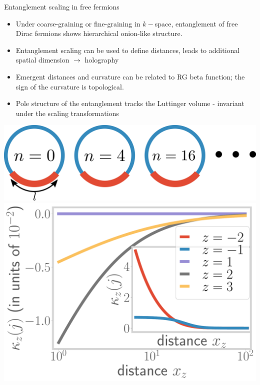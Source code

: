 \documentclass[10pt,aspectratio=169]{beamer}
\begin{document}
\begin{frame}{Entanglement scaling in free fermions}
\hspace*{-40pt}
\begin{minipage}{0.65\textwidth}
\begin{itemize}
	\item Under coarse-graining or fine-graining in \(k-\)space, entanglement of free Dirac fermions shows hierarchical onion-like structure.
	\item Entanglement scaling can be used to define distances, leads to additional spatial dimension \(\longrightarrow\) holography
	\item Emergent distances and curvature can be related to RG beta function; the sign of the curvature is topological.
	\item Pole structure of the entanglement tracks the Luttinger volume - invariant under the scaling transformations
\end{itemize}
\end{minipage}
\hspace*{5pt}
\begin{minipage}{0.41\textwidth}
\includegraphics[width=\textwidth]{figures/A_mi.pdf}
\includegraphics[width=\textwidth]{curvature-pos.pdf}
\end{minipage}
\hspace*{-40pt}
\end{frame}
\end{document}
